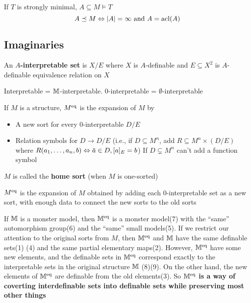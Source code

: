 \documentclass[11pt]{article}
\begin{document}
\begin{fact}[]
If \(T\) is strongly minimal, \(A\subseteq M\vDash T\)
\begin{equation*}
A\preceq M\Leftrightarrow\abs{A}=\infty\text{ and }A=\acl(A)
\end{equation*}
\end{fact}


\subsection{Imaginaries}
\label{sec:orgf921a13}
\begin{definition}[]
An \textbf{\(A\)-interpretable set} is \(X/E\) where \(X\) is \(A\)-definable and \(E\subseteq X^2\)
is \(A\)-definable equivalence relation on \(X\)
\end{definition}

Interpretable = \(\mathbb{M}\)-interpretable. 0-interpretable = \(\emptyset\)-interpretable

\begin{definition}[]
If \(M\) is a structure, \(M^{\operatorname{eq}}\) is the expansion of \(M\) by
\begin{itemize}
\item A new sort for every 0-interpretable \(D/E\)
\item Relation symbols for \(D\to D/E\) (i.e., if \(D\subseteq M^n\), add \(R\subseteq M^n\times(D/E)\)
where \(R(a_1,\dots,a_n,b)\Leftrightarrow\bara\in D,[a]_E=b\)) If \(D\subsetneq M^n\) can't add a function symbol
\end{itemize}


\(M\) is called the \textbf{home sort} (when \(M\) is one-sorted)
\end{definition}

\(M^{\operatorname{eq}}\) is the expansion of \(M\) obtained by adding each 0-interpretable set as a new sort,
with enough data to connect the new sorts to the old sorts

If \(\mathbb{M}\) is a monster model, then \(\mathbb{M}^{\operatorname{eq}}\) is a monster model(7) with the ``same'' automorphism
group(6) and the ``same'' small models(5). If we restrict our attention to the original sorts from
\(M\), then \(\mathbb{M}^{\operatorname{eq}}\) and \(\mathbb{M}\) have the same definable sets(1) (4) and the same partial
elementary maps(2). However, \(\mathbb{M}^{\operatorname{eq}}\) have some new elements, and the definable sets
in \(\mathbb{M}^{\operatorname{eq}}\) correspond exactly to the interpretable sets in the original structure \(\mathbb{M}\)
(8)(9). On the other hand, the new elements of \(\mathbb{M}^{\operatorname{eq}}\) are definable from the old
elements(3). So \textbf{\(\mathbb{M}^{\operatorname{eq}}\) is a way of coverting interdefinable sets into definable sets while}
\textbf{preserving most other things}
\end{document}
